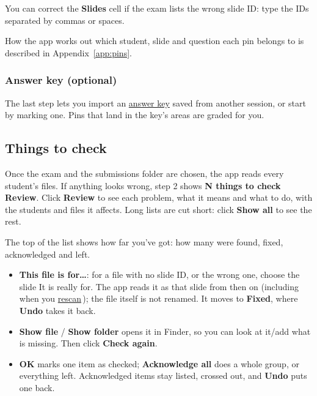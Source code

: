 You can correct the \textbf{Slides} cell if the exam lists the wrong slide ID: type the IDs separated by commas or spaces.

How the app works out which student, slide and question each pin belongs to is described in Appendix~\ref{app:pins}.

\subsubsection{Answer key (optional)}\label{sec:getting-started:answer-key-optional}

The last step lets you import an \hyperref[sec:answer-key]{answer key} saved from another session, or start by marking one. Pins that land in the key's areas are graded for you.

\subsection[Things to check\alsotoc{sec:getting-started:saving-and-backups}{Saving and backups}]{Things to check}\label{sec:getting-started:things-to-check}

Once the exam and the submissions folder are chosen, the app reads every student's files. If anything looks wrong, step 2 shows \textbf{\warnsym{} N things to check \textperiodcentered{} Review}. Click \textbf{Review} to see each problem, what it means and what to do, with the students and files it affects. Long lists are cut short: click \textbf{Show all} to see the rest.

The top of the list shows how far you've got: how many were found, fixed, acknowledged and left.

\begin{itemize}[topsep=2pt, itemsep=2pt]
\item \textbf{This file is for\ldots{}}: for a file with no slide ID, or the wrong one, choose the slide It is really for. The app reads it as that slide from then on (including when you \href{https://github.com/agadin/micro-speed-grader/blob/main/docs/help/getting-started.md\#new-and-changed-submissions}{rescan}\,\onlinemark{}); the file itself is not renamed. It moves to \textbf{Fixed}, where \textbf{Undo} takes it back.
\item \textbf{Show file} / \textbf{Show folder} opens it in Finder, so you can look at it/add what is missing. Then click \textbf{Check again}.
\item \textbf{OK} marks one item as checked; \textbf{Acknowledge all} does a whole group, or everything left. Acknowledged items stay listed, crossed out, and \textbf{Undo} puts one back.
\end{itemize}

